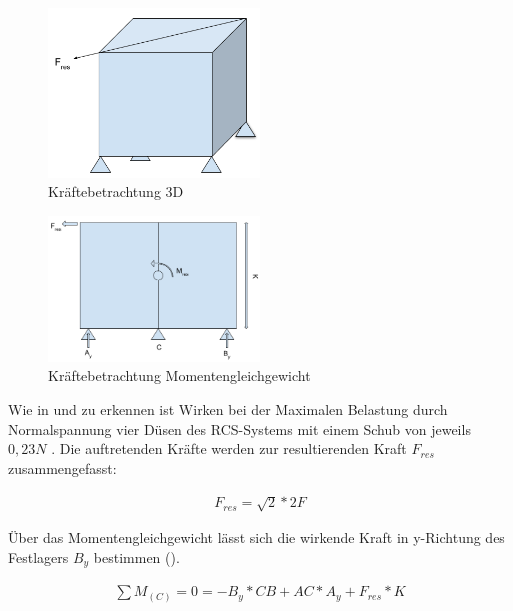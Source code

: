 \begin{figure}[h]
	\centering
		\includegraphics[width=0.50\textwidth]{graphics/Gecko_Rechnung2.png}
	\caption{Kräftebetrachtung 3D}
	\label{fig:Gecko_Rechnung2}
\end{figure}

\begin{figure}[h]
	\centering
		\includegraphics[width=0.50\textwidth]{graphics/Gecko_Rechnung3.png}
	\caption{Kräftebetrachtung Momentengleichgewicht}
	\label{fig:Gecko_Rechnung3}
\end{figure}


Wie in  und  zu erkennen ist Wirken bei der Maximalen Belastung durch Normalspannung vier Düsen des RCS-Systems mit einem Schub von jeweils $0,23 N$ . Die auftretenden Kräfte werden zur resultierenden Kraft $F_{res}$  zusammengefasst:

	\begin{eqnarray}
			F_{res}=\sqrt{ 2 }*2F
	\end{eqnarray}

Über das Momentengleichgewicht lässt sich die wirkende Kraft in y-Richtung des Festlagers $B_y$  bestimmen ().

\begin{eqnarray}
		\sum{  }{  }{ M_{(C)} }=0=-B_y*CB+AC*A_y+F_{res}*K
\end{eqnarray}

